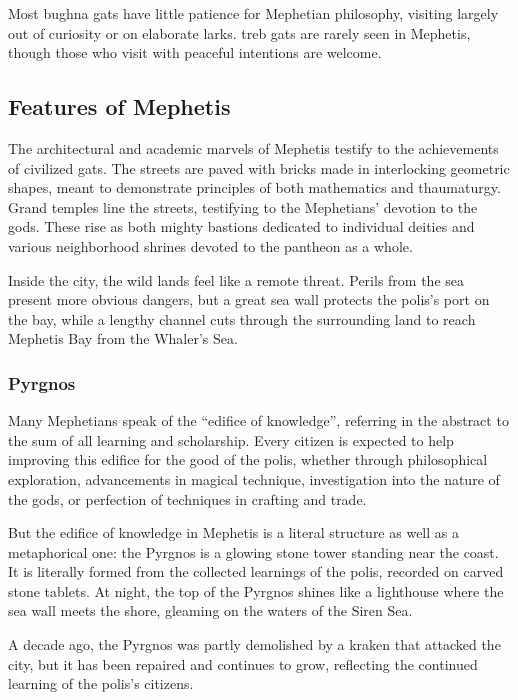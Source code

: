         Most bughna gats have little patience for Mephetian philosophy, visiting largely out of curiosity or on elaborate larks.
        treb gats are rarely seen in Mephetis, though those who visit with peaceful intentions are welcome.

\subsection*{Features of Mephetis}
    The architectural and academic marvels of Mephetis testify to the achievements of civilized gats.
    The streets are paved with bricks made in interlocking geometric shapes, meant to demonstrate principles of both mathematics and thaumaturgy.
    Grand temples line the streets, testifying to the Mephetians' devotion to the gods.
    These rise as both mighty bastions dedicated to individual deities and various neighborhood shrines devoted to the pantheon as a whole.

    Inside the city, the wild lands feel like a remote threat.
    Perils from the sea present more obvious dangers, but a great sea wall protects the polis's port on the bay, while a lengthy channel cuts through the surrounding land to reach Mephetis Bay from the Whaler's Sea.

    \subsubsection{Pyrgnos}
        Many Mephetians speak of the ``edifice of knowledge'', referring in the abstract to the sum of all learning and scholarship.
        Every citizen is expected to help improving this edifice for the good of the polis, whether through philosophical exploration, advancements in magical technique, investigation into the nature of the gods, or perfection of techniques in crafting and trade.

        But the edifice of knowledge in Mephetis is a literal structure as well as a metaphorical one: the Pyrgnos is a glowing stone tower standing near the coast.
        It is literally formed from the collected learnings of the polis, recorded on carved stone tablets.
        At night, the top of the Pyrgnos shines like a lighthouse where the sea wall meets the shore, gleaming on the waters of the Siren Sea.

        A decade ago, the Pyrgnos was partly demolished by a kraken that attacked the city, but it has been repaired and continues to grow, reflecting the continued learning of the polis's citizens.

